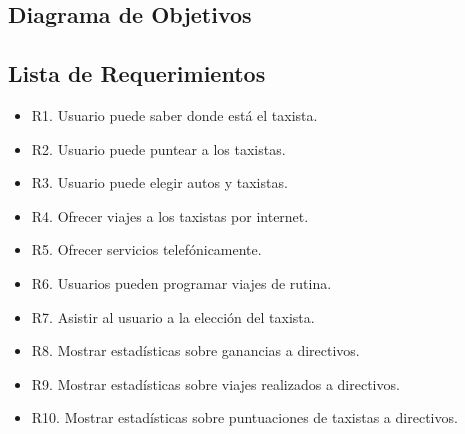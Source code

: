 \subsection{Diagrama de Objetivos}
\subsection{Lista de Requerimientos}
	\begin{itemize}
		\item R1. Usuario puede saber donde está el taxista.
		\item R2. Usuario puede puntear a los taxistas.
		\item R3. Usuario puede elegir autos y taxistas.
		\item R4. Ofrecer viajes a los taxistas por internet.
		\item R5. Ofrecer servicios telefónicamente.
		\item R6. Usuarios pueden programar viajes de rutina.
		\item R7. Asistir al usuario a la elección del taxista.
		\item R8. Mostrar estadísticas sobre ganancias a directivos.
		\item R9. Mostrar estadísticas sobre viajes realizados a directivos.
		\item R10. Mostrar estadísticas sobre puntuaciones de taxistas a directivos.
	
	\end{itemize}

